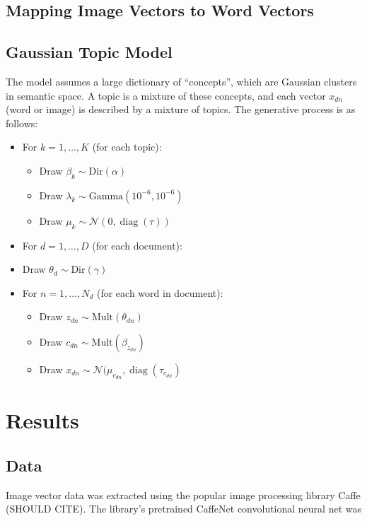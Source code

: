 \documentclass[11pt]{article}
\DeclareMathOperator{\diag}{diag}
\begin{document}
\subsection{Mapping Image Vectors to Word Vectors}

\subsection{Gaussian Topic Model}
The model assumes a large dictionary of ``concepts'', which are Gaussian clusters in semantic space. A topic is a mixture of these concepts, and each vector $x_{dn}$ (word or image) is described by a mixture of topics. The generative process is as follows:
\begin{itemize}
\item For $k = 1, \ldots, K$ (for each topic):
  \begin{itemize}
    \item Draw $\beta_k \sim \mbox{Dir}(\alpha)$
    \item Draw $\lambda_k \sim \mbox{Gamma}(10^{-6}, 10^{-6})$
    \item Draw $\mu_k \sim \mathcal{N}(0, \diag(\tau))$
  \end{itemize}
\item For $d = 1, \ldots, D$ (for each document):
  \item Draw $\theta_d \sim \mbox{Dir}(\gamma)$
  \item For $n = 1, \ldots, N_d$ (for each word in document):
  \begin{itemize}
    \item Draw $z_{dn} \sim \mbox{Mult}(\theta_{dn})$
    \item Draw $c_{dn} \sim \mbox{Mult}(\beta_{z_{dn}})$
    \item Draw $x_{dn} \sim \mathcal{N}(\mu_{c_{dn}}, \diag(\tau_{c_{dn}})$
  \end{itemize}
\end{itemize}

\section{Results}

\subsection{Data}
\label{sec:data}
Image vector data was extracted using the popular image processing library Caffe (SHOULD CITE). The library's pretrained CaffeNet convolutional neural net was 
\end{document}
